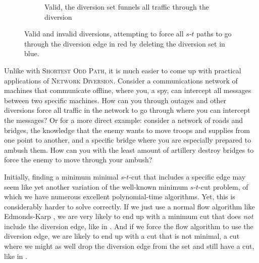 \begin{figure}[H]
\begin{subfigure}{.3\textwidth}
        \caption{Valid, the diversion set funnels all traffic through the diversion}
        \label{subfigure:valid-diversion}
    \end{subfigure}
    \caption{Valid and invalid diversions, attempting to force all $s$-$t$ paths to go through the diversion edge in red by deleting the diversion set in blue.}
    \label{figure:diversion-attempts}
\end{figure}

Unlike with \textsc{Shortest Odd Path}, it is much easier to come up with practical applications of \textsc{Network Diversion}. Consider a communications network of machines that communicate offline, where you, a spy, can intercept all messages between two specific machines. How can you through outages and other diversions force all traffic in the network to go through where you can intercept the messages? Or for a more direct example: consider a network of roads and bridges, the knowledge that the enemy wants to move troops and supplies from one point to another, and a specific bridge where you are especially prepared to ambush them. How can you with the least amount of artillery destroy bridges to force the enemy to move through your ambush?

Initially, finding a minimum minimal $s$-$t$-cut that includes a specific edge may seem like yet another variation of the well-known minimum $s$-$t$-cut problem, of which we have numerous excellent polynomial-time algorithms. Yet, this is considerably harder to solve correctly. If we just use a normal flow algorithm like Edmonds-Karp \cite{source:edmonds-karp-algorithn}, we are very likely to end up with a minimum cut that does \emph{not} include the diversion edge, like in . And if we force the flow algorithm to use the diversion edge, we are likely to end up with a cut that is not minimal, a cut where we might as well drop the diversion edge from the set and still have a cut, like in .

